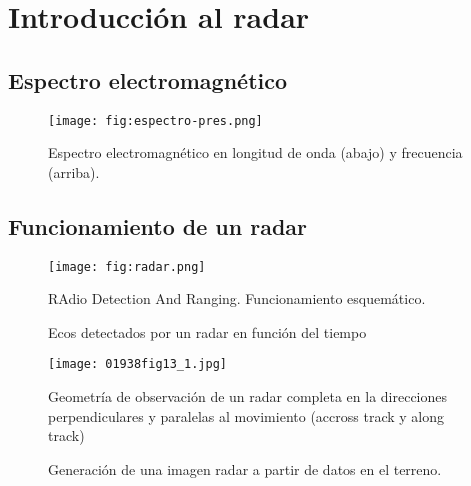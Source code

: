 \section{Introducción al radar}
\subsection{Espectro electromagnético}
\begin{frame}{} \vskip0cm
  \begin{figure}
    \centering
    \texttt{[image: fig:espectro-pres.png]}
    \caption{Espectro electromagnético en longitud de onda (abajo) y frecuencia (arriba).}
    \label{}
  \end{figure}
\end{frame}

\subsection{Funcionamiento de un radar}
\begin{frame}{} \vskip0cm
    \begin{figure}
      \centering
      \texttt{[image: fig:radar.png]}
      \caption{RAdio Detection And Ranging. Funcionamiento esquemático.}
      \label{}
    \end{figure}
\end{frame}

\begin{frame}{} \vskip0cm
  \begin{figure}
    \centering
    \caption{Ecos detectados por un radar en función del tiempo}
    \label{}
  \end{figure}
\end{frame}

\begin{frame}{} \vskip0cm
  \begin{figure}
    \centering
    \texttt{[image: 01938fig13\_1.jpg]}
    \caption{Geometría de observación de un radar completa en la direcciones perpendiculares y paralelas al movimiento (accross track y along track)}
    \label{}
  \end{figure}
\end{frame}


\begin{frame}{} \vskip0cm
  \begin{figure}
    \centering
    \caption{Generación de una imagen radar a partir de datos en el terreno.}
    \label{}
  \end{figure}
\end{frame}

